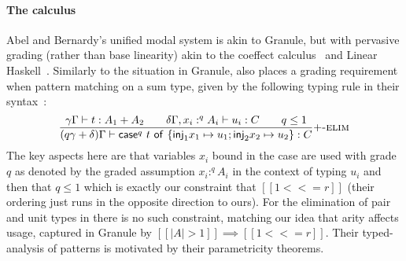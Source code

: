 \paragraph{The \abname{} calculus} Abel and Bernardy's unified modal system
\abname{} is akin to Granule, but with pervasive grading (rather than base
linearity) akin to the coeffect calculus~\citep{petricek2014coeffects} and Linear
Haskell~\citep{DBLP:journals/pacmpl/BernardyBNJS18}. Similarly to the situation
in Granule, \abname{} also places a grading requirement when pattern matching on
a sum type, given by the following typing rule in their syntax~\citep[Fig 1,
p.4]{DBLP:journals/pacmpl/AbelB20}:
%
\begin{align*}
\dfrac{\gamma \Gamma \vdash t : A_1 + A_2 \qquad \delta\Gamma, x_i :^q
  A_i \vdash u_i : C \qquad q \leq 1}
      {(q\gamma + \delta)\Gamma \vdash \mathsf{case}^q\ t\ \mathsf{of}\
  \{\mathsf{inj}_1 x_1 \mapsto u_1; \mathsf{inj}_2 x_2 \mapsto u_2 \}
  : C}\textsc{$+$-elim}
\end{align*}
%
The key aspects here are that variables $x_i$ bound in the case are used
with grade $q$ as denoted by the graded assumption $x_i :^q A_i$ in the context of
typing $u_i$ and then that $q \leq 1$ which is exactly our
constraint that $[[ 1 <<= r ]]$ (their ordering just runs in the
opposite direction to ours). For the elimination of pair and unit
types in \abname{} there is no such constraint, matching our idea that arity
affects usage, captured in Granule by $[[ | A | > 1 ]] \implies [[ 1
<<= r ]]$. Their typed-analysis of patterns is motivated
by their parametricity theorems.

